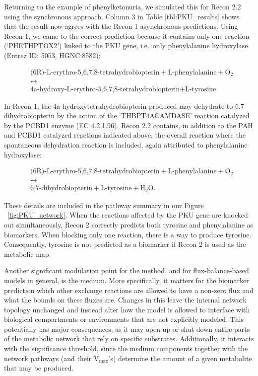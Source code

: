 \documentclass[10pt,a4paper,onecolumn]{article}
\begin{document}
Returning to the example of phenylketonuria, we simulated this for Recon
2.2 using the synchronous approach. Column 3 in Table
{[}tbl:PKU\_results{]} shows that the result now agrees with the Recon 1
asynchronous predictions. Using Recon 1, we came to the correct
prediction because it contains only one reaction (`PHETHPTOX2') linked
to the PKU gene, i.e.~only phenylalanine hydroxylase (Entrez ID: 5053,
HGNC:8582):

\begin{align*}
&\text{(6R)-L-erythro-5,6,7,8-tetrahydrobiopterin} + \text{L-phenylalanine} + \text{O}_2 \\
&\leftrightarrow \\
&\text{4a-hydroxy-L-erythro-5,6,7,8-tetrahydrobiopterin} + \text{L-tyrosine}
\end{align*}

In Recon 1, the 4a-hydroxytetrahydrobiopterin produced may dehydrate to
6,7-dihydrobiopterin by the action of the `THBPT4ACAMDASE' reaction
catalyzed by the PCBD1 enzyme (EC 4.2.1.96). Recon 2.2 contains, in
addition to the PAH and PCBD1 catalyzed reactions indicated above, the
overall reaction where the spontaneous dehydration reaction is included,
again attributed to phenylalanine hydroxylase:

\begin{align*}
&\text{(6R)-L-erythro-5,6,7,8-tetrahydrobiopterin} + \text{L-phenylalanine} + \text{O}_2 \\
&\leftrightarrow \\
&\text{6,7-dihydrobiopterin} + \text{L-tyrosine} + \text{H}_2\text{O}.
\end{align*}

These details are included in the pathway summary in our Figure
~\ref{fig:PKU_network}. When the reactions affected by the PKU gene are
knocked out simultaneously, Recon 2 correctly predicts both tyrosine and
phenylalanine as biomarkers. When blocking only one reaction, there is a
way to produce tyrosine. Consequently, tyrosine is not predicted as a
biomarker if Recon 2 is used as the metabolic map.

Another significant modulation point for the method, and for
flux-balance-based models in general, is the medium. More specifically,
it matters for the biomarker prediction which other exchange reactions
are allowed to have a non-zero flux and what the bounds on these fluxes
are. Changes in this leave the internal network topology unchanged and
instead alter how the model is allowed to interface with biological
compartments or environments that are not explicitly modeled. This
potentially has major consequences, as it may open up or shut down
entire parts of the metabolic network that rely on specific substrates.
Additionally, it interacts with the significance threshold, since the
medium components together with the network pathways (and their
V\(_{\text{max}}\)'s) determine the amount of a given metabolite that
may be produced.
\end{document}
